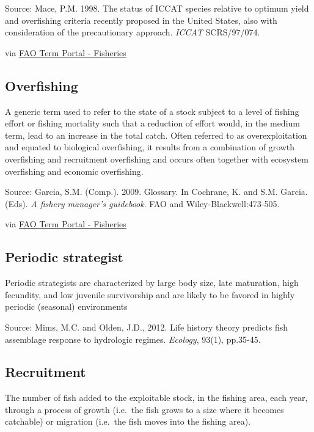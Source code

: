 \documentclass[
  11pt,
]{book}
\begin{document}
Source: Mace, P.M. 1998. The status of ICCAT species relative to optimum yield and overfishing criteria recently proposed in the United States, also with consideration of the precautionary approach. \emph{ICCAT} SCRS/97/074.

via \href{http://www.fao.org/fishery/glossary/en}{FAO Term Portal - Fisheries}

\hypertarget{overfishing}{%
\subsection{Overfishing}\label{overfishing}}

A generic term used to refer to the state of a stock subject to a level of fishing effort or fishing mortality such that a reduction of effort would, in the medium term, lead to an increase in the total catch. Often referred to as overexploitation and equated to biological overfishing, it results from a combination of growth overfishing and recruitment overfishing and occurs often together with ecosystem overfishing and economic overfishing.

Source: Garcia, S.M. (Comp.). 2009. Glossary. In Cochrane, K. and S.M. Garcia. (Eds). \emph{A fishery manager's guidebook}. FAO and Wiley-Blackwell:473-505.

via \href{http://www.fao.org/fishery/glossary/en}{FAO Term Portal - Fisheries}

\hypertarget{periodic-strategist}{%
\subsection{Periodic strategist}\label{periodic-strategist}}

Periodic strategists are characterized by large body size, late maturation, high fecundity, and low juvenile survivorship and are likely to be favored in highly periodic (seasonal) environments

Source: Mims, M.C. and Olden, J.D., 2012. Life history theory predicts fish assemblage response to hydrologic regimes. \emph{Ecology}, 93(1), pp.35-45.

\hypertarget{recruitment}{%
\subsection{Recruitment}\label{recruitment}}

The number of fish added to the exploitable stock, in the fishing area, each year, through a process of growth (i.e.~the fish grows to a size where it becomes catchable) or migration (i.e.~the fish moves into the fishing area).
\end{document}
